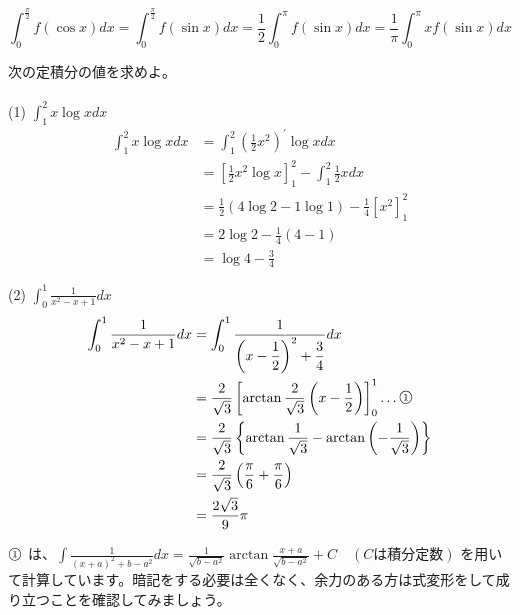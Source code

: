 \documentclass[a4j]{jsarticle}
\newcommand{\ctext}[1]{\raise0.2ex\hbox{\textcircled{\scriptsize{#1}}}} %
\begin{document}
    \begin{equation*}
        \int_{0}^{\frac{\pi}{2}} f(\cos x)dx = \int_{0}^{\frac{\pi}{2}} f(\sin x)dx = \frac{1}{2} \int_{0}^{\pi}f(\sin x)dx = \frac{1}{\pi} \int_{0}^{\pi}xf(\sin x)dx
    \end{equation*}

    次の定積分の値を求めよ。\\ \\

    (1) $\displaystyle \int_{1}^{2} x \log x dx$ \\

    \begin{align*}
        \int_{1}^{2} x \log x dx &= \int_{1}^{2} \left(\frac{1}{2}x^2\right)^{\prime} \log x dx \\
        &= \left[\frac{1}{2}x^2 \log x\right]_{1}^{2} - \int_{1}^{2} \frac{1}{2} xdx \\
        &= \frac{1}{2} (4 \log 2 - 1 \log 1) - \frac{1}{4} \left[x^2\right]_{1}^{2} \\
        &= 2 \log 2 - \frac{1}{4} (4 - 1) \\
        &= \log 4 - \frac{3}{4}
    \end{align*}

    (2) $\displaystyle \int_{0}^{1} \frac{1}{x^2 - x + 1} dx$ \\

    \begin{align*}
        \int_{0}^{1} \frac{1}{x^2 - x + 1} dx &= \int_{0}^{1} \frac{1}{\left(x - \dfrac{1}{2}\right)^2 + \dfrac{3}{4}} dx \\
        &= \frac{2}{\sqrt{3}} \left[\arctan \frac{2}{\sqrt{3}}\left(x - \frac{1}{2}\right)\right]_{0}^{1} \dots \ctext{1} \\
        &= \frac{2}{\sqrt{3}} \left\{\arctan \frac{1}{\sqrt{3}} - \arctan\left(-\frac{1}{\sqrt{3}}\right)\right\} \\
        &= \frac{2}{\sqrt{3}} \left(\frac{\pi}{6} + \frac{\pi}{6}\right) \\
        &= \frac{2\sqrt{3}}{9} \pi
    \end{align*}

    \begin{screen}
        $\ctext{1}$ は、$ \displaystyle \int \frac{1}{\left(x + a\right)^2 + b - a^2} dx = \frac{1}{\sqrt{b - a^2}} \arctan \frac{x + a}{\sqrt{b - a^2}} + C \quad (C は積分定数)$
        を用いて計算しています。暗記をする必要は全くなく、余力のある方は式変形をして成り立つことを確認してみましょう。
    \end{screen}
    \\
\end{document}
